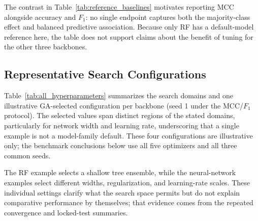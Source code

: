 The contrast in Table~\ref{tab:reference_baselines} motivates reporting MCC alongside accuracy and $F_1$: no single endpoint captures both the majority-class effect and balanced predictive association. Because only RF has a default-model reference here, the table does not support claims about the benefit of tuning for the other three backbones.

\subsection{Representative Search Configurations}
\label{sec:performance_models}

Table~\ref{tab:all_hyperparameters} summarizes the search domains and one illustrative GA-selected configuration per backbone (seed 1 under the MCC/$F_1$ protocol). The selected values span distinct regions of the stated domains, particularly for network width and learning rate, underscoring that a single example is not a model-family default. These four configurations are illustrative only; the benchmark conclusions below use all five optimizers and all three common seeds.

The RF example selects a shallow tree ensemble, while the neural-network examples select different widths, regularization, and learning-rate scales. These individual settings clarify what the search space permits but do not explain comparative performance by themselves; that evidence comes from the repeated convergence and locked-test summaries.

